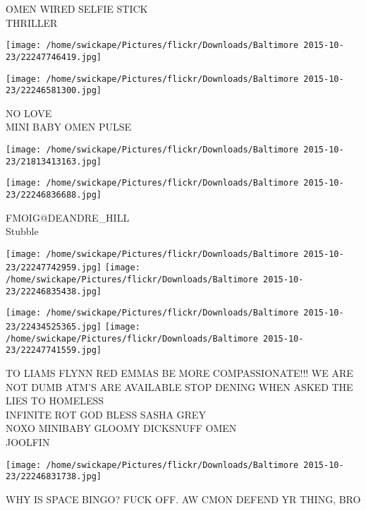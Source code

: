 \documentclass[10pt,letterpaper]{article}
\begin{document}
OMEN WIRED SELFIE STICK\\
THRILLER
\pagebreak

\texttt{[image: /home/swickape/Pictures/flickr/Downloads/Baltimore 2015-10-23/22247746419.jpg]}

\vspace{0.25in}
\texttt{[image: /home/swickape/Pictures/flickr/Downloads/Baltimore 2015-10-23/22246581300.jpg]}

NO LOVE\\
MINI BABY OMEN PULSE
\pagebreak

\texttt{[image: /home/swickape/Pictures/flickr/Downloads/Baltimore 2015-10-23/21813413163.jpg]}

\vspace{0.25in}
\texttt{[image: /home/swickape/Pictures/flickr/Downloads/Baltimore 2015-10-23/22246836688.jpg]}

FMOIG@DEANDRE\_HILL\\
Stubble
\pagebreak

\texttt{[image: /home/swickape/Pictures/flickr/Downloads/Baltimore 2015-10-23/22247742959.jpg]}
\texttt{[image: /home/swickape/Pictures/flickr/Downloads/Baltimore 2015-10-23/22246835438.jpg]}

\texttt{[image: /home/swickape/Pictures/flickr/Downloads/Baltimore 2015-10-23/22434525365.jpg]}
\texttt{[image: /home/swickape/Pictures/flickr/Downloads/Baltimore 2015-10-23/22247741559.jpg]}

TO LIAMS FLYNN RED EMMAS BE MORE COMPASSIONATE!!! WE ARE NOT DUMB ATM'S ARE AVAILABLE STOP DENING WHEN ASKED THE LIES TO HOMELESS\\
INFINITE ROT GOD BLESS SASHA GREY\\
NOXO MINIBABY GLOOMY DICKSNUFF OMEN\\
JOOLFIN
\pagebreak

\texttt{[image: /home/swickape/Pictures/flickr/Downloads/Baltimore 2015-10-23/22246831738.jpg]}

WHY IS SPACE BINGO?  FUCK OFF.  AW CMON DEFEND YR THING, BRO
\pagebreak
\end{document}
